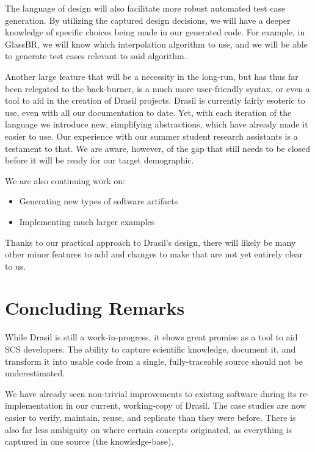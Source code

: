 \documentclass[sigconf]{acmart}
\newcommand{\authornt}[3]{\textcolor{#1}{[#3 ---#2]}}
\newcommand{\authornt}[3]{}
\newcommand{\spr}[1]{\authornt{green}{SP}{#1}} %
\begin{document}
{The language of design will also facilitate more robust automated test case 
generation. By utilizing the captured design decisions, we will have a deeper 
knowledge of specific choices being made in our generated code. For example, in 
GlassBR, we will know which interpolation algorithm to use, and we will be able 
to generate test cases relevant to said algorithm.


Another large feature that will be a necessity in the long-run, but has thus 
far been relegated to the back-burner, is a much more user-friendly syntax, or 
even a tool to aid in the creation of Drasil projects. Drasil is currently
fairly esoteric to use, even with all our documentation to date. Yet, with 
each iteration of the language we introduce new, simplifying abstractions, 
which have already made it easier to use. Our experience with our summer student 
research assistants is a testament to that. We are aware, however, of the gap 
that still needs to be closed before it will be ready for our target 
demographic.

We are also continuing work on:
\begin{itemize}
    \item Generating new types of software artifacts
    \item Implementing much larger examples
\end{itemize}

Thanks to our practical approach to Drasil's design, there will likely be many 
other minor features to add and changes to make that are not yet entirely clear 
to us.

\section{Concluding Remarks}

While Drasil is still a work-in-progress, it shows great promise as a tool to 
aid SCS developers. The ability to capture scientific knowledge, document it, 
and transform it into usable code from a single, fully-traceable source should 
not be underestimated.

We have already seen non-trivial improvements to existing software during its 
re-implementation in our current, working-copy of Drasil. The case studies are 
now easier to verify, maintain, reuse, and replicate than they were before. 
There is also far less ambiguity on where certain concepts originated, as 
everything is captured in one source (the knowledge-base).

}
\end{document}
